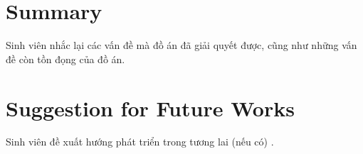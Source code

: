 \section{Summary}

Sinh viên nhắc lại các vấn đề mà đồ án đã giải quyết được, cũng như những vấn đề còn tồn đọng của đồ án.  

\section{Suggestion for Future Works }

Sinh viên đề xuất hướng phát triển trong tương lai (nếu có) .  

